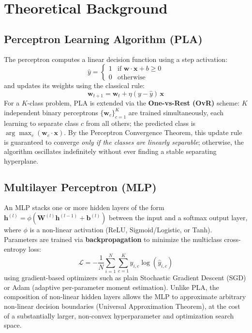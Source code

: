 \documentclass[12pt,a4paper]{article}
\begin{document}
\section{Theoretical Background}

\subsection{Perceptron Learning Algorithm (PLA)}
The perceptron computes a linear decision function using a step activation:
\begin{equation}
\hat{y} = \begin{cases} 1 & \text{if } \mathbf{w}\cdot\mathbf{x} + b \ge 0 \\ 0 & \text{otherwise} \end{cases}
\end{equation}
and updates its weights using the classical rule:
\begin{equation}
\mathbf{w}_{t+1} = \mathbf{w}_t + \eta(y - \hat{y})\,\mathbf{x}
\end{equation}
For a $K$-class problem, PLA is extended via the \textbf{One-vs-Rest (OvR)} scheme: $K$ independent binary perceptrons $\{\mathbf{w}_c\}_{c=1}^{K}$ are trained simultaneously, each learning to separate class $c$ from all others; the predicted class is $\arg\max_c (\mathbf{w}_c \cdot \mathbf{x})$. By the Perceptron Convergence Theorem, this update rule is guaranteed to converge \textit{only if the classes are linearly separable}; otherwise, the algorithm oscillates indefinitely without ever finding a stable separating hyperplane.

\subsection{Multilayer Perceptron (MLP)}
An MLP stacks one or more hidden layers of the form $\mathbf{h}^{(l)} = \phi(\mathbf{W}^{(l)}\mathbf{h}^{(l-1)} + \mathbf{b}^{(l)})$ between the input and a softmax output layer, where $\phi$ is a non-linear activation (ReLU, Sigmoid/Logistic, or Tanh). Parameters are trained via \textbf{backpropagation} to minimize the multiclass cross-entropy loss:
\begin{equation}
\mathcal{L} = -\frac{1}{N}\sum_{i=1}^{N}\sum_{c=1}^{K} y_{i,c}\log(\hat{y}_{i,c})
\end{equation}
using gradient-based optimizers such as plain Stochastic Gradient Descent (SGD) or Adam (adaptive per-parameter moment estimation). Unlike PLA, the composition of non-linear hidden layers allows the MLP to approximate arbitrary non-linear decision boundaries (Universal Approximation Theorem), at the cost of a substantially larger, non-convex hyperparameter and optimization search space.
\end{document}
